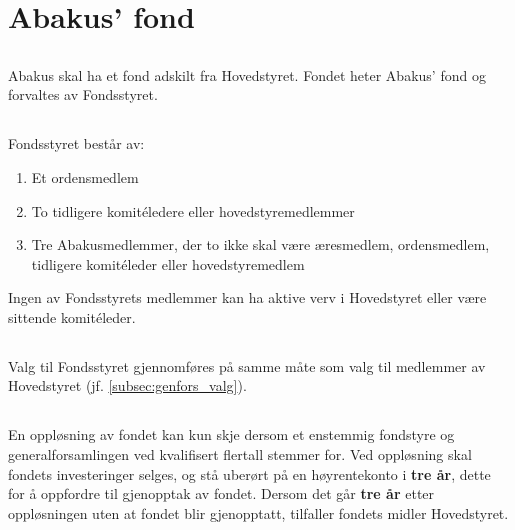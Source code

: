 \section{Abakus' fond}

\subsection{}
Abakus skal ha et fond adskilt fra Hovedstyret. Fondet heter Abakus’ fond og
forvaltes av Fondsstyret.

\subsection{}
Fondsstyret består av:
\begin{enumerate}[label=\alph*)]
    \item Et ordensmedlem
    \item To tidligere komitéledere eller hovedstyremedlemmer
    \item Tre Abakusmedlemmer, der to ikke skal være æresmedlem, ordensmedlem, tidligere komitéleder eller hovedstyremedlem
\end{enumerate}
Ingen av Fondsstyrets medlemmer kan ha aktive verv i Hovedstyret eller være sittende komitéleder. 

\subsection{}
Valg til Fondsstyret gjennomføres på samme måte som valg til medlemmer av Hovedstyret (jf. \ref{subsec:genfors_valg}).

\subsection{}
En oppløsning av fondet kan kun skje dersom et enstemmig fondstyre og generalforsamlingen ved kvalifisert flertall 
stemmer for. Ved oppløsning skal fondets investeringer selges, og stå uberørt på en høyrentekonto i \textbf{tre år}, dette for å
oppfordre til gjenopptak av fondet. Dersom det går \textbf{tre år} etter oppløsningen uten at fondet blir gjenopptatt, 
tilfaller fondets midler Hovedstyret.

